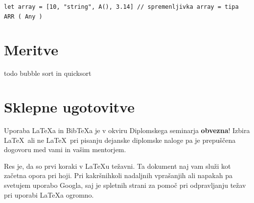 \documentclass[a4paper, 12pt]{book}
\newcommand{\BibTeX}{{\sc Bib}\TeX}
\begin{document}
\begin{lstlisting}[caption={Elementi tabele nimajo skupnega tipa}, captionpos=b]
	let array = [10, "string", A(), 3.14] // spremenljivka array = tipa ARR ( Any )
\end{lstlisting}

\chapter{Meritve}

todo bubble sort in quicksort

\chapter{Sklepne ugotovitve}

Uporaba \LaTeX{a} in \BibTeX{a} je v okviru Diplomskega seminarja \textbf{obvezna}!
Izbira \LaTeX\ ali ne \LaTeX\ pri pisanju dejanske diplomske naloge pa je pre\-pu\-šče\-na dogovoru med vami in vašim mentorjem.

Res je, da so prvi koraki v \LaTeX{}u težavni. 
Ta dokument naj vam služi kot začetna opora pri hoji.
Pri kakršnihkoli nadaljnih vprašanjih ali napakah pa svetujem uporabo Googla, saj je spletnih strani za pomoč pri odpravljanju težav pri uporabi \LaTeX{}a ogromno.


\newpage %

\clearpage
{}


\end{document}
